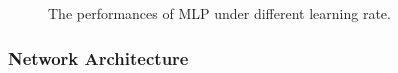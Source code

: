 \documentclass[12pt,a4paper]{article}
\theoremstyle{definition}
\begin{document}
\begin{figure}[H]
	\centering
	\caption{The performances of MLP under different learning rate.}
	\label{fig:mlp-lr}
\end{figure}

\subsubsection{Network Architecture}
\end{document}
